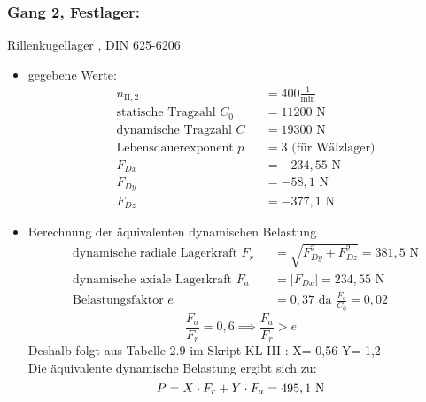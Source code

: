 \subsubsection{Gang 2, Festlager:} Rillenkugellager , DIN 625-6206\\
\begin{itemize}
	\item gegebene Werte:
	\begin{align*}
	&n_{{\mathord{\mathrm{II}},2}} &&=  400 \frac{1}{\text{min}} \\
	&\text{statische Tragzahl } C_{0} &&= 11200 \text{ N}\\
	&\text{dynamische Tragzahl } C &&= 19300 \text{ N} \\
	&\text{Lebensdauerexponent } p &&= 3 \text{ (für Wälzlager)} \\
	&F_{Dx} && = -234,55 \text{ N}\\
	&F_{Dy} && = -58,1 \text{ N}\\
	&F_{Dz} && = -377,1 \text{ N}
	\end{align*} 
	\item Berechnung der äquivalenten dynamischen Belastung
	\begin{align*}
	&\text{dynamische radiale Lagerkraft } F_r&& = \sqrt{F_{Dy}^2 + F_{Dz}^2 } = 381,5 \text{ N} \\
	&\text{dynamische axiale Lagerkraft } F_a&& = |F_{Dx}| = 234,55 \text{ N}\\
	&\text{Belastungsfaktor } e &&= 0,37 \text{ da } \frac{F_a}{C_0} = 0,02
	\end{align*}
	\[\frac{F_a}{F_r} = 0,6 \implies \frac{F_a}{F_r} > e\]
	Deshalb folgt aus Tabelle 2.9 im Skript KL III : X= 0,56 \text{, } Y= 1,2 \\
	Die äquivalente dynamische Belastung ergibt sich zu: 
	\[
	P= X \cdot F_r + Y \cdot F_a = 495,1 \text{ N}
	\]
\end{itemize}
\newpage
